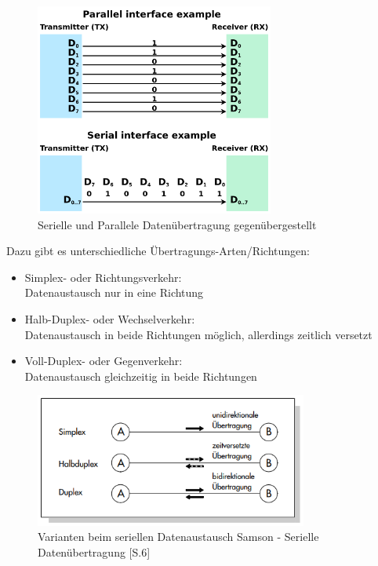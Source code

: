 \begin{figure}[h]
    \centering
    \includegraphics[width=0.7\textwidth]{resources/images/Serial_and_Parallel_Data_Transmission.svg.png}
    \caption[Datenübertragungen]{Serielle und Parallele Datenübertragung gegenübergestellt \cite{ser-vs-par}}
    \label{fig:Seriell}
\end{figure}


Dazu gibt es unterschiedliche Übertragungs-Arten/Richtungen:
\begin{itemize}
    \item Simplex- oder Richtungsverkehr: \\
          Datenaustausch nur in eine Richtung
    \item Halb-Duplex- oder Wechselverkehr: \\
          Datenaustausch in beide Richtungen möglich, allerdings zeitlich versetzt
    \item Voll-Duplex- oder Gegenverkehr: \\
          Datenaustausch gleichzeitig in beide Richtungen
\end{itemize}

\begin{figure}[H]
    \centering
    \includegraphics[width=0.8\textwidth]{resources/images/Duplex.png}
    \caption[Varianten beim Datenaustausch]{Varianten beim seriellen Datenaustausch
        Samson - Serielle Datenübertragung \cite{seriell}[S.6]}
    \label{fig:Duplex}
\end{figure}

